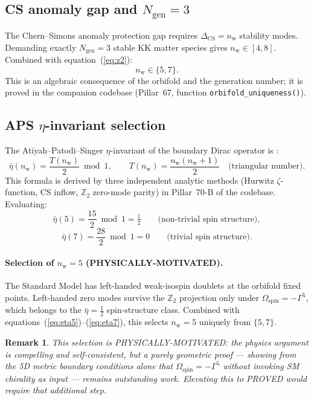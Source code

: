 \documentclass[12pt,a4paper]{article}
\newtheorem{remark}[theorem]{Remark}
\newcommand{\nw}{n_{\mathrm{w}}}
\begin{document}
\subsection{CS anomaly gap and $N_{\mathrm{gen}}=3$}

The Chern--Simons anomaly protection gap requires $\Delta_{\mathrm{CS}}=\nw$
stability modes.  Demanding exactly $N_{\mathrm{gen}}=3$ stable KK matter
species gives $\nw\in[4,8]$.  Combined with equation~(\ref{eq:z2}):
\begin{equation}
  \boxed{\nw \in \{5,7\}.}
  \label{eq:nw57}
\end{equation}
This is an algebraic consequence of the orbifold and the generation number;
it is proved in the companion codebase (Pillar~67, function
\texttt{orbifold\_uniqueness()}).

\subsection{APS $\eta$-invariant selection}

The Atiyah--Patodi--Singer $\eta$-invariant of the boundary Dirac operator is
\cite{APS1975}:
\begin{equation}
  \bar\eta(\nw) = \frac{T(\nw)}{2} \bmod 1 ,
  \qquad
  T(\nw) = \frac{\nw(\nw+1)}{2} \quad\text{(triangular number)}.
  \label{eq:eta}
\end{equation}
This formula is derived by three independent analytic methods (Hurwitz
$\zeta$-function, CS inflow, $\mathbb{Z}_2$ zero-mode parity) in
Pillar~70-B of the codebase.  Evaluating:
\begin{equation}
  \bar\eta(5) = \frac{15}{2} \bmod 1 = \tfrac{1}{2}
  \qquad\text{(non-trivial spin structure)},
  \label{eq:eta5}
\end{equation}
\begin{equation}
  \bar\eta(7) = \frac{28}{2} \bmod 1 = 0
  \qquad\text{(trivial spin structure)}.
  \label{eq:eta7}
\end{equation}

\paragraph{Selection of $\nw=5$ (PHYSICALLY-MOTIVATED).}
The Standard Model has left-handed weak-isospin doublets at the orbifold fixed
points.  Left-handed zero modes survive the $\mathbb{Z}_2$ projection only
under $\Omega_{\mathrm{spin}}=-\Gamma^5$, which belongs to the $\bar\eta=\tfrac{1}{2}$
spin-structure class.  Combined with equations~(\ref{eq:eta5})--(\ref{eq:eta7}),
this selects $\nw=5$ uniquely from $\{5,7\}$.
\begin{remark}
  This selection is PHYSICALLY-MOTIVATED: the physics argument is compelling
  and self-consistent, but a purely geometric proof — showing from the 5D metric
  boundary conditions alone that $\Omega_{\mathrm{spin}}=-\Gamma^5$ without
  invoking SM chirality as input — remains outstanding work.  Elevating this to
  PROVED would require that additional step.
\end{remark}
\end{document}
